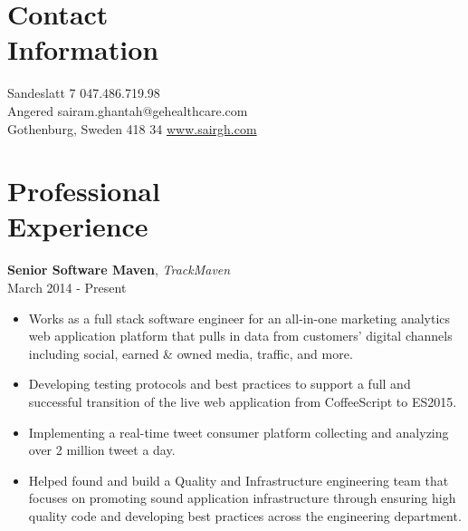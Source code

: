 \documentclass[margin,line,10pt]{resume}
\begin{document}
\begin{resume}

\section{\mysidestyle Contact\\Information\\\vspace{5pt}}

Sandeslatt 7                    \hfill 047.486.719.98\vspace{0mm}\\
Angered                            \hfill sairam.ghantah@gehealthcare.com\vspace{0mm}\\
Gothenburg, Sweden 418 34           \hfill \href{http://www.sairgh.com}{www.sairgh.com}\vspace{0mm}

\section{\mysidestyle Professional\\Experience\\\vspace{5pt}}

\textbf{Senior Software Maven}, \textsl{TrackMaven}\\March 2014 - Present\vspace{2mm}%
\begin{itemize}
    \item Works as a full stack software engineer for an all-in-one marketing analytics web application platform that pulls in data from customers' digital channels including social, earned \& owned media, traffic, and more.
    \item Developing testing protocols and best practices to support a full and successful transition of the live web application from CoffeeScript to ES2015. 
    \item Implementing a real-time tweet consumer platform collecting and analyzing over 2 million tweet a day. 
    \item Helped found and build a Quality and Infrastructure engineering team that focuses on promoting sound application infrastructure through ensuring high quality code and developing best practices across the engineering department.
\end{itemize}


\end{resume}
\end{document}
